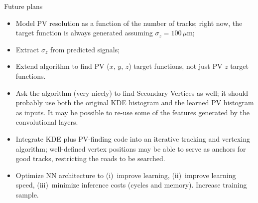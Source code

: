 \begin{frame}{Future plans}
    \begin{itemize}
        \item
          Model PV resolution as a function of the number of tracks; right now, the target
          function is always generated assuming $ \sigma_z = 100 \, \mu $m;
        \item
          Extract $ \sigma_z $ from predicted signals;
        \item
          Extend algorithm to find PV ($ x, \, y, \, z $) target functions,
          not just PV $ z $ target functions.
        \item
          Ask the algorithm (very nicely) to find Secondary Vertices as well;
          it should probably use both the original KDE histogram and the
          learned PV histogram as inputs.
          It may be possible to re-use some of the features generated by the
          convolutional layers.
        \item
          Integrate  KDE plus PV-finding code into an iterative tracking and vertexing
          algorithm; well-defined vertex positions may be able to serve as anchors for
          good tracks, restricting the roads to be searched.
        \item
          Optimize NN architecture to (i)~improve learning, (ii)~improve learning speed,
          (iii)~minimize inference costs (cycles and memory).
          Increase training sample.
    \end{itemize}
\end{frame}
